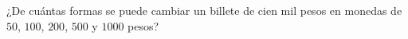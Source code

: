 ¿De cuántas formas se puede cambiar un billete de cien mil pesos en monedas de $50$, $100$, $200$, $500$ y $1000$ pesos?
